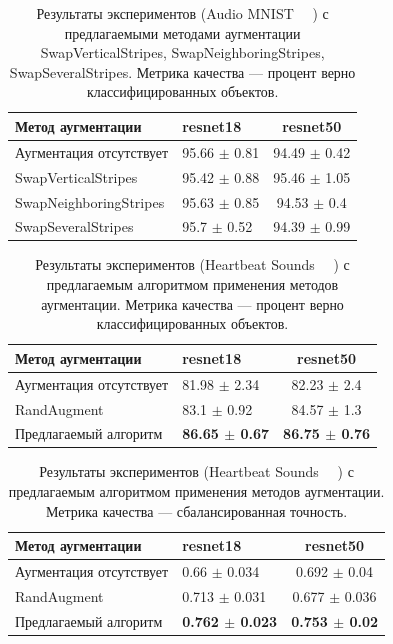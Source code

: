 \documentclass[12pt, fleqn]{article}
\begin{document}
\begin{table}[ht!]
    \centering
	\begin{tabular}{| l | l | c |}
    	\hline
	    Метод аугментации & resnet18 & resnet50 \\ \hline
	    Аугментация отсутствует  & 95.66 $\pm$ 0.81 & 94.49 $\pm$ 0.42 \\ \hline
	    SwapVerticalStripes & 95.42 $\pm$ 0.88 & 95.46 $\pm$  1.05 \\ \hline
	    SwapNeighboringStripes & 95.63 $\pm$ 0.85 & 94.53 $\pm$ 0.4 \\ \hline
	    SwapSeveralStripes & 95.7 $\pm$ 0.52 & 94.39 $\pm$ 0.99 \\ \hline
	\end{tabular}
	\caption{Результаты экспериментов (Audio MNIST ~\cite{AudioMnistArticle}~\cite{AudioMnistKaggle}) с предлагаемыми методами аугментации SwapVerticalStripes, SwapNeighboringStripes, SwapSeveralStripes. Метрика качества --- процент верно классифицированных объектов.}
	\label{table:lukianov_pavel_t2}
\end{table}

\newpage

\begin{table}[ht!]
    \centering
	\begin{tabular}{| l | l | c |}
    	\hline
	    Метод аугментации & resnet18 & resnet50 \\ \hline
	    Аугментация отсутствует  & 81.98 $\pm$ 2.34 & 82.23 $\pm$ 2.4 \\ \hline
	    RandAugment ~\cite{RandAugment} & 83.1 $\pm$ 0.92 & 84.57 $\pm$ 1.3 \\ \hline
	    Предлагаемый алгоритм & \textbf{86.65 $\pm$ 0.67} & \textbf{86.75 $\pm$ 0.76} \\ \hline
	\end{tabular}
	\caption{Результаты экспериментов (Heartbeat Sounds ~\cite{HeartbeatSoundsArticle}~\cite{HeartbeatSoundsKaggle}) с предлагаемым алгоритмом применения методов аугментации. Метрика качества --- процент верно классифицированных объектов.}
	\label{table:lukianov_pavel_t3}
\end{table}

\begin{table}[ht!]
    \centering
	\begin{tabular}{| l | l | c |}
    	\hline
	    Метод аугментации & resnet18 & resnet50 \\ \hline
	    Аугментация отсутствует  & 0.66 $\pm$ 0.034 & 0.692 $\pm$ 0.04 \\ \hline
	    RandAugment ~\cite{RandAugment} & 0.713 $\pm$ 0.031 & 0.677 $\pm$ 0.036 \\ \hline
	    Предлагаемый алгоритм & \textbf{0.762 $\pm$ 0.023} & \textbf{0.753 $\pm$ 0.02} \\ \hline
	\end{tabular}
	\caption{Результаты экспериментов (Heartbeat Sounds ~\cite{HeartbeatSoundsArticle}~\cite{HeartbeatSoundsKaggle}) с предлагаемым алгоритмом применения методов аугментации. Метрика качества --- сбалансированная точность.}
	\label{table:lukianov_pavel_t3}
\end{table}
\end{document}
